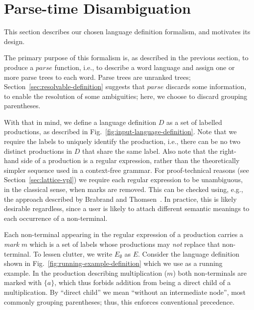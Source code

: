 \documentclass[runningheads]{llncs}
\newcommand{\parse}{\mathit{parse}} %
\begin{document}
\section{Parse-time Disambiguation} \label{sec:parse-time-disambiguation}

This section describes our chosen language definition formalism, and motivates its design.

The primary purpose of this formalism is, as described in the previous section, to produce a $\parse$ function, i.e., to describe a word language and assign one or more parse trees to each word. Parse trees are unranked trees; Section~\ref{sec:resolvable-definition} suggests that $\parse$ discards some information, to enable the resolution of some ambiguities; here, we choose to discard grouping parentheses.

With that in mind, we define a language definition $D$ as a set of labelled productions, as described in Fig.~\ref{fig:input-language-definition}. Note that we require the labels to uniquely identify the production, i.e., there can be no two distinct productions in $D$ that share the same label. Also note that the right-hand side of a production is a regular expression, rather than the theoretically simpler sequence used in a context-free grammar. For proof-technical reasons (see Section~\ref{sec:lattice-vpl}) we require each regular expression to be unambiguous, in the classical sense, when marks are removed. This can be checked using, e.g., the approach described by Brabrand and Thomsen~\cite{brabrandTypedUnambiguousPattern2010}. In practice, this is likely desirable regardless, since a user is likely to attach different semantic meanings to each occurrence of a non-terminal.

Each non-terminal appearing in the regular expression of a production carries a \emph{mark} $m$ which is a set of labels whose productions may \emph{not} replace that non-terminal. To lessen clutter, we write $E_\emptyset$ as $E$. Consider the language definition shown in Fig.~\ref{fig:running-example-definition} which we use as a running example. In the production describing multiplication ($m$) both non-terminals are marked with $\{a\}$, which thus forbids addition from being a direct child of a multiplication. By ``direct child'' we mean ``without an intermediate node'', most commonly grouping parentheses; thus, this enforces conventional precedence.
\end{document}
